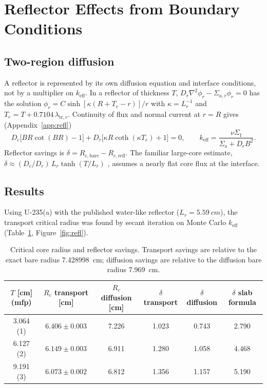 \documentclass[11pt,letterpaper]{article}
\newcommand{\keff}{k_\mathrm{eff}}
\newcommand{\Sig}[1]{\Sigma_\mathrm{#1}}
\begin{document}
\section{Reflector Effects from Boundary Conditions}
\label{sec:reflector}

\subsection{Two-region diffusion}
A reflector is represented by its own diffusion equation and interface conditions, not by a multiplier on $\keff$. In a reflector of thickness $T$, $D_r\nabla^2\phi_r - \Sigma_{a,r}\phi_r = 0$ has the solution $\phi_r = C\sinh[\kappa(R + T_e - r)]/r$ with $\kappa = L_r^{-1}$ and $T_e = T + 0.7104\,\lambda_{\mathrm{tr},r}$. Continuity of flux and normal current at $r=R$ gives (Appendix~\ref{app:refl})
\begin{equation}
  D_c\bigl[BR\cot(BR) - 1\bigr] + D_r\bigl[\kappa R\coth(\kappa T_e) + 1\bigr] = 0,
  \qquad \keff = \frac{\nu\Sig{f}}{\Sig{a} + D_cB^2}.
  \label{eq:refl}
\end{equation}
Reflector savings is $\delta = R_{c,\mathrm{bare}} - R_{c,\mathrm{refl}}$. The familiar large-core estimate, $\delta \approx (D_c/D_r)\,L_r\tanh(T/L_r)$ \citep{Lamarsh2001}, assumes a nearly flat core flux at the interface.

\subsection{Results}
Using U-235(a) with the published water-like reflector ($L_r = \SI{5.59}{cm}$), the transport critical radius was found by secant iteration on Monte Carlo $\keff$ (Table~\ref{tab:refl}, Figure~\ref{fig:refl}).

\begin{table}[ht]
\centering
\caption[Reflector savings]{Critical core radius and reflector savings. Transport savings are relative to the exact bare radius \SI{7.428998}{cm}; diffusion savings are relative to the diffusion bare radius \SI{7.969}{cm}.}
\label{tab:refl}
\small
\begin{tabular}{@{}cccccc@{}}
\toprule
$T$ [cm] (mfp) & $R_c$ transport [cm] & $R_c$ diffusion [cm] & $\delta$ transport & $\delta$ diffusion & $\delta$ slab formula \\
\midrule
3.064 (1) & $6.406 \pm 0.003$ & 7.226 & 1.023 & 0.743 & 2.790 \\
6.127 (2) & $6.149 \pm 0.003$ & 6.911 & 1.280 & 1.058 & 4.468 \\
9.191 (3) & $6.073 \pm 0.002$ & 6.812 & 1.356 & 1.157 & 5.190 \\
\bottomrule
\end{tabular}
\end{table}
\end{document}
